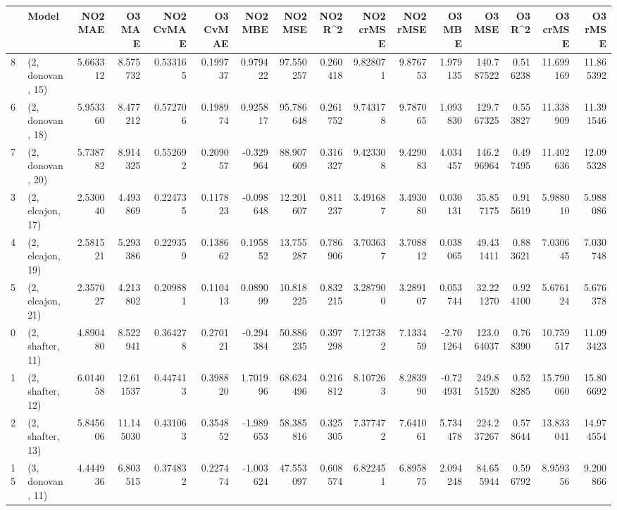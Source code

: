 \begin{tabular}{llrrrrrrrrrrrrrr}
\toprule
{} &             Model &   NO2 MAE &     O3 MAE &  NO2 CvMAE &  O3 CvMAE &   NO2 MBE &     NO2 MSE &   NO2 R\textasciicircum2 &  NO2 crMSE &   NO2 rMSE &     O3 MBE &      O3 MSE &    O3 R\textasciicircum2 &   O3 crMSE &    O3 rMSE \\
\midrule
8  &  (2, donovan, 15) &  5.663312 &   8.575732 &   0.533165 &  0.199737 &  0.979422 &   97.550257 &  0.260418 &   9.828071 &   9.876753 &   1.979135 &  140.787522 &  0.516238 &  11.699169 &  11.865392 \\
6  &  (2, donovan, 18) &  5.953360 &   8.477212 &   0.572706 &  0.198974 &  0.925817 &   95.786648 &  0.261752 &   9.743178 &   9.787065 &   1.093830 &  129.767325 &  0.553827 &  11.338909 &  11.391546 \\
7  &  (2, donovan, 20) &  5.738782 &   8.914325 &   0.552692 &  0.209057 & -0.329964 &   88.907609 &  0.316327 &   9.423308 &   9.429083 &   4.034457 &  146.296964 &  0.497495 &  11.402636 &  12.095328 \\
3  &  (2, elcajon, 17) &  2.530040 &   4.493869 &   0.224735 &  0.117823 & -0.098648 &   12.201607 &  0.811237 &   3.491687 &   3.493080 &   0.030131 &   35.857175 &  0.915619 &   5.988010 &   5.988086 \\
4  &  (2, elcajon, 19) &  2.581521 &   5.293386 &   0.229359 &  0.138662 &  0.195852 &   13.755287 &  0.786906 &   3.703637 &   3.708812 &   0.038065 &   49.431411 &  0.883621 &   7.030645 &   7.030748 \\
5  &  (2, elcajon, 21) &  2.357027 &   4.213802 &   0.209881 &  0.110413 &  0.089099 &   10.818225 &  0.832215 &   3.287900 &   3.289107 &   0.053744 &   32.221270 &  0.924100 &   5.676124 &   5.676378 \\
0  &  (2, shafter, 11) &  4.890480 &   8.522941 &   0.364278 &  0.270121 & -0.294384 &   50.886235 &  0.397298 &   7.127382 &   7.133459 &  -2.701264 &  123.064037 &  0.768390 &  10.759517 &  11.093423 \\
1  &  (2, shafter, 12) &  6.014058 &  12.611537 &   0.447413 &  0.398820 &  1.701996 &   68.624496 &  0.216812 &   8.107263 &   8.283990 &  -0.724931 &  249.851520 &  0.528285 &  15.790060 &  15.806692 \\
2  &  (2, shafter, 13) &  5.845606 &  11.145030 &   0.431063 &  0.354852 & -1.989653 &   58.385816 &  0.325305 &   7.377472 &   7.641061 &   5.734478 &  224.237267 &  0.578644 &  13.833041 &  14.974554 \\
15 &  (3, donovan, 11) &  4.444936 &   6.803515 &   0.374832 &  0.227474 & -1.003624 &   47.553097 &  0.608574 &   6.822451 &   6.895875 &   2.094248 &   84.655944 &  0.596792 &   8.959356 &   9.200866 \\

\end{tabular}
